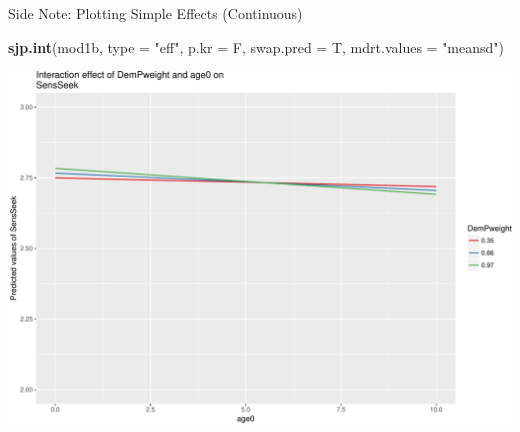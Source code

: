 \documentclass[ignorenonframetext,]{beamer}
\newenvironment{Shaded}{\begin{snugshade}}{\end{snugshade}}
\newcommand{\KeywordTok}[1]{\textcolor[rgb]{0.13,0.29,0.53}{\textbf{{#1}}}}
\newcommand{\DataTypeTok}[1]{\textcolor[rgb]{0.13,0.29,0.53}{{#1}}}
\newcommand{\StringTok}[1]{\textcolor[rgb]{0.31,0.60,0.02}{{#1}}}
\newcommand{\NormalTok}[1]{{#1}}
\begin{document}
\begin{frame}[fragile]{Side Note: Plotting Simple Effects (Continuous)}

\small

\begin{Shaded}
\begin{Highlighting}[]
\KeywordTok{sjp.int}\NormalTok{(mod1b, }\DataTypeTok{type =} \StringTok{"eff"}\NormalTok{, }\DataTypeTok{p.kr =} \NormalTok{F, }\DataTypeTok{swap.pred =} \NormalTok{T, }\DataTypeTok{mdrt.values =} \StringTok{"meansd"}\NormalTok{)}
\end{Highlighting}
\end{Shaded}

\includegraphics{Conditional_Models_files/figure-beamer/unnamed-chunk-31-1.pdf}

\normalsize  

\end{frame}
\end{document}
